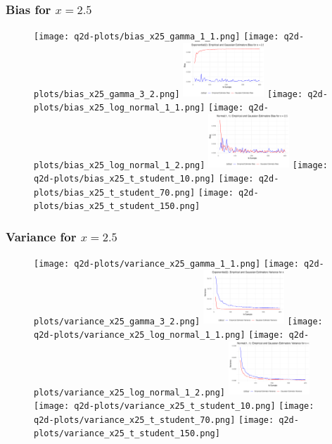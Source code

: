 \documentclass{article}
\begin{document}
{\subsubsection*{Bias for $x = 2.5$}

\begin{figure}[H]
  \centering
  \texttt{[image: q2d-plots/bias\_x25\_gamma\_1\_1.png]}
  \texttt{[image: q2d-plots/bias\_x25\_gamma\_3\_2.png]}
  \includegraphics[width=115px]{q2d-plots/bias_x25_exponential.png}
  \texttt{[image: q2d-plots/bias\_x25\_log\_normal\_1\_1.png]}
  \texttt{[image: q2d-plots/bias\_x25\_log\_normal\_1\_2.png]}
  \includegraphics[width=115px]{q2d-plots/bias_x25_normal.png}
  \texttt{[image: q2d-plots/bias\_x25\_t\_student\_10.png]}
  \texttt{[image: q2d-plots/bias\_x25\_t\_student\_70.png]}
  \texttt{[image: q2d-plots/bias\_x25\_t\_student\_150.png]}
  \label{fig:bias_x25}
\end{figure}

\subsubsection*{Variance for $x = 2.5$}

\begin{figure}[H]
  \centering
  \texttt{[image: q2d-plots/variance\_x25\_gamma\_1\_1.png]}
  \texttt{[image: q2d-plots/variance\_x25\_gamma\_3\_2.png]}
  \includegraphics[width=115px]{q2d-plots/variance_x25_exponential.png}
  \texttt{[image: q2d-plots/variance\_x25\_log\_normal\_1\_1.png]}
  \texttt{[image: q2d-plots/variance\_x25\_log\_normal\_1\_2.png]}
  \includegraphics[width=115px]{q2d-plots/variance_x25_normal.png}
  \texttt{[image: q2d-plots/variance\_x25\_t\_student\_10.png]}
  \texttt{[image: q2d-plots/variance\_x25\_t\_student\_70.png]}
  \texttt{[image: q2d-plots/variance\_x25\_t\_student\_150.png]}
  \label{fig:variance_x25}
\end{figure}

}
\end{document}
